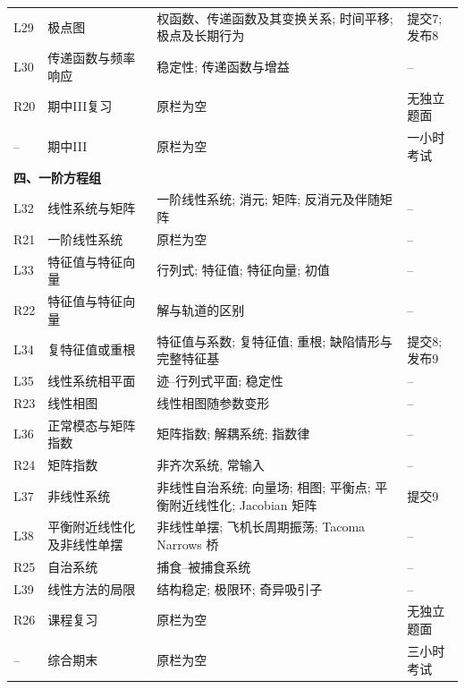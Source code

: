 \begin{longtable}{p{}p{}p{}p{}}
L29 & 极点图 & 权函数、传递函数及其变换关系; 时间平移; 极点及长期行为 & 提交7; 发布8 \\
L30 & 传递函数与频率响应 & 稳定性; 传递函数与增益 & -- \\
R20 & 期中III复习 & 原栏为空 & 无独立题面 \\
-- & 期中III & 原栏为空 & 一小时考试 \\
\multicolumn{4}{l}{\textbf{四、一阶方程组}}\\
L32 & 线性系统与矩阵 & 一阶线性系统; 消元; 矩阵; 反消元及伴随矩阵 & -- \\
R21 & 一阶线性系统 & 原栏为空 & -- \\
L33 & 特征值与特征向量 & 行列式; 特征值; 特征向量; 初值 & -- \\
R22 & 特征值与特征向量 & 解与轨道的区别 & -- \\
L34 & 复特征值或重根 & 特征值与系数; 复特征值; 重根; 缺陷情形与完整特征基 & 提交8; 发布9 \\
L35 & 线性系统相平面 & 迹--行列式平面; 稳定性 & -- \\
R23 & 线性相图 & 线性相图随参数变形 & -- \\
L36 & 正常模态与矩阵指数 & 矩阵指数; 解耦系统; 指数律 & -- \\
R24 & 矩阵指数 & 非齐次系统, 常输入 & -- \\
L37 & 非线性系统 & 非线性自治系统; 向量场; 相图; 平衡点; 平衡附近线性化; Jacobian 矩阵 & 提交9 \\
L38 & 平衡附近线性化及非线性单摆 & 非线性单摆; 飞机长周期振荡; Tacoma Narrows 桥 & -- \\
R25 & 自治系统 & 捕食--被捕食系统 & -- \\
L39 & 线性方法的局限 & 结构稳定; 极限环; 奇异吸引子 & -- \\
R26 & 课程复习 & 原栏为空 & 无独立题面 \\
-- & 综合期末 & 原栏为空 & 三小时考试 \\
\bottomrule
\end{longtable}
